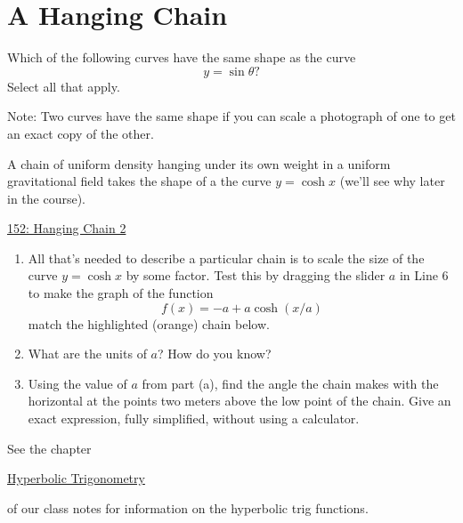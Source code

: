 \documentclass{ximera}
\begin{document}
\section{A Hanging Chain}

\begin{question} \label{QJFefexxxwe}
Which of the following curves have the same shape as the curve
\[
    y = \sin\theta?
\]
Select all that apply.

\begin{selectAll}
\end{selectAll}

Note: Two curves have the same shape if you can scale a photograph of one to get an exact copy of the other.

\end{question}

\begin{question} \label{iifkdeyq3y}
A chain of uniform density hanging under its own weight in a uniform gravitational field takes the shape of a the curve $y=\cosh x$ (we'll see why later in the course).


\begin{onlineOnly}
    \begin{center}
\end{center}
\end{onlineOnly}

\href{https://www.desmos.com/calculator/iifkdeyq3y}{152: Hanging Chain 2}


\begin{enumerate} 


\item All that's needed to describe a particular chain is to scale the size of the curve $y=\cosh x$ by some factor. Test this by dragging the slider $a$ in Line 6 to make the graph of the function
\[
     f(x) = -a + a\cosh(x/a)
\]
match the highlighted (orange) chain below.

\item What are the units of $a$? How do you know?

\item Using the value of $a$ from part (a), find the angle the chain makes with the horizontal at the points two meters above the low point of the chain. Give an exact expression, fully simplified, without using a calculator.
\end{enumerate}

See the chapter

\href{https://ximera.osu.edu/calcone/Calculus1/HyperbolicTrig/HyperbolicTrig}{Hyperbolic Trigonometry}

of our class notes for information on the hyperbolic trig functions.

\end{question}
\end{document}
